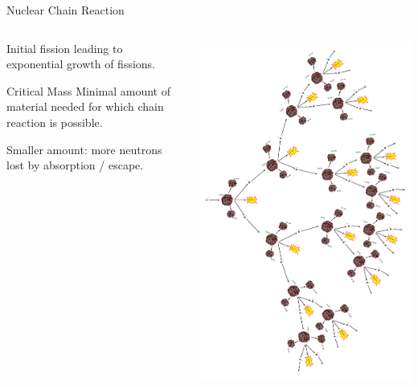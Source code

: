 \documentclass[presentation]{beamer}
\begin{document}
\begin{frame}[label=sec-1-3]{Nuclear Chain Reaction}
\begin{columns}
\begin{column}{0.45\textwidth}

Initial fission leading to exponential growth of fissions.

\begin{block}{Critical Mass}
Minimal amount of material needed for which chain reaction is possible.\\
\end{block}

Smaller amount: more neutrons lost by absorption / escape.
\end{column}

\begin{column}{0.45\textwidth}

\begin{varblock}[0.9 \textwidth]{}
\includegraphics[width=\textwidth]{images/Kettenreaktion}
\end{varblock}


\end{column}
\end{columns}
\end{frame}
\end{document}
